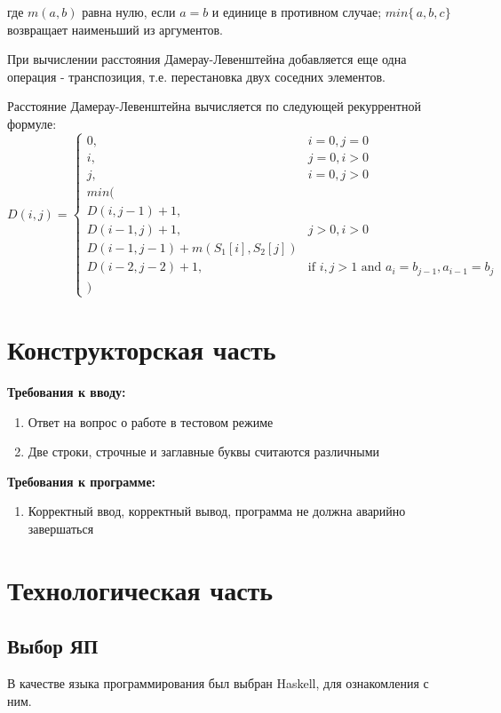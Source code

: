 \documentclass[12pt]{report}
\begin{document}
где $m(a,b)$ равна нулю, если $a=b$ и единице в противном случае; $min\{\,a,b,c\}$ возвращает наименьший из аргументов.

При вычислении расстояния Дамерау-Левенштейна добавляется еще одна операция - транспозиция, т.е. перестановка двух соседних элементов.

Расстояние Дамерау-Левенштейна вычисляется по следующей рекуррентной формуле:
\begin{displaymath}
D(i,j) = \left\{ \begin{array}{ll}
 0, & \textrm{$i = 0, j = 0$}\\
 i, & \textrm{$j = 0, i > 0$}\\
 j, & \textrm{$i = 0, j > 0$}\\
min(\\
D(i,j-1)+1,\\
D(i-1, j) +1, &\textrm{$j>0, i>0$}\\
D(i-1, j-1) + m(S_{1}[i], S_{2}[j])\\
D(i-2, j-2) + 1, &\textrm{if $i,j>1$ and $a_{i} = b_{j-1},a_{i-1}=b_{j} $}\\
)
  \end{array} \right.
\end{displaymath}

\chapter{Конструкторская часть}
\textbf{Требования к вводу:}
\begin{enumerate}
	\item Ответ на вопрос о работе в тестовом режиме
  	\item Две строки, строчные и заглавные буквы считаются различными
\end{enumerate}
\textbf{Требования к программе:}
\begin{enumerate}
  	\item Корректный ввод, корректный вывод, программа не должна аварийно завершаться
\end{enumerate}


\chapter{Технологическая часть}
\section{Выбор ЯП}
В качестве языка программирования был выбран Haskell, для ознакомления с ним.
\end{document}
